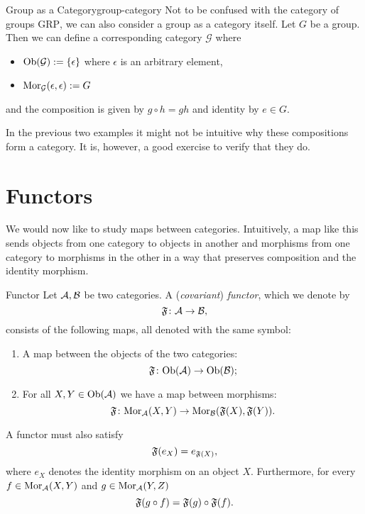 \begin{example}{Group as a Category}{group-category}
Not to be confused with the category of groups $\mathrm{GRP}$, we can also consider a group as a category itself.
Let $G$ be a group. Then we can define a corresponding category $\mathcal{G}$ where
\begin{itemize}
    \item $\mathrm {Ob}(\mathcal{G}) := \{\epsilon\}$ where $\epsilon$ is an arbitrary element,
    \item $\mathrm {Mor}_{\mathcal{G}}(\epsilon,\epsilon) := G$
\end{itemize}
and the composition is given by $g \circ h = gh$ and identity by $e \in G$.
\end{example}
In the previous two examples it might not be intuitive why these compositions form a category. It is, however, a good exercise to verify that they do.

\section{Functors}
We would now like to study maps between categories.
%
Intuitively, a map like this sends objects from one category to objects in another and morphisms from one category to morphisms in the other in a way that preserves composition and the identity morphism.

\begin{definition}{Functor \cite[Sec.~1.3]{Roman2017}}{}
Let $\mathcal{A}, \mathcal{B}$ be two categories. A (\emph{covariant}) \emph{functor}, which we denote by
$$
\mathfrak{F}\colon \mathcal{A} \to \mathcal{B},
$$
consists of the following maps, all denoted with the same symbol:
\begin{enumerate}
    \item A map between the objects of the two categories:
    \begin{equation*}
    \mathfrak{F}\colon \mathrm {Ob}(\mathcal{A}) \to \mathrm {Ob}(\mathcal{B});
    \end{equation*}
    \item For all $X,Y \in \mathrm {Ob}(\mathcal{A})$ we have a map between morphisms: 
    \begin{equation}
    \label{eq:functor_morphism_map}
    \mathfrak{F}\colon \mathrm {Mor}_{\mathcal{A}}(X,Y) \to \mathrm {Mor}_{\mathcal{B}}(\mathfrak{F}(X), \mathfrak{F}(Y)).
    \end{equation}
\end{enumerate}
A functor must also satisfy
\begin{equation}
\label{eq:functor_functoriality_identity}
\mathfrak{F}(e_X) = e_{\mathfrak{F}(X)},
\end{equation}
where $e_X$ denotes the identity morphism on an object $X$. Furthermore, for every ${f \in \mathrm {Mor}_{\mathcal{A}}(X,Y)}$ and $g \in \mathrm {Mor}_{\mathcal{A}}(Y,Z)$
\begin{equation}
\label{eq:functor_functoriality}
\mathfrak{F}(g \circ f) = \mathfrak{F}(g) \circ \mathfrak{F}(f).
\end{equation}
\end{definition}

